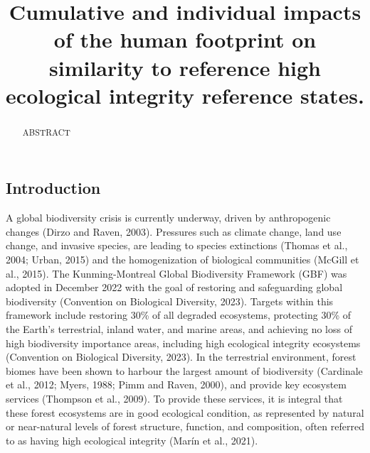 \documentclass[
]{agujournal2019}
\begin{document}
\title{Cumulative and individual impacts of the human footprint on
similarity to reference high ecological integrity reference states.}



\begin{abstract}
ABSTRACT
\end{abstract}




\subsection{Introduction}\label{introduction}

A global biodiversity crisis is currently underway, driven by
anthropogenic changes (Dirzo and Raven, 2003). Pressures such as climate
change, land use change, and invasive species, are leading to species
extinctions (Thomas et al., 2004; Urban, 2015) and the homogenization of
biological communities (McGill et al., 2015). The Kunming-Montreal
Global Biodiversity Framework (GBF) was adopted in December 2022 with
the goal of restoring and safeguarding global biodiversity (Convention
on Biological Diversity, 2023). Targets within this framework include
restoring 30\% of all degraded ecosystems, protecting 30\% of the
Earth's terrestrial, inland water, and marine areas, and achieving no
loss of high biodiversity importance areas, including high ecological
integrity ecosystems (Convention on Biological Diversity, 2023). In the
terrestrial environment, forest biomes have been shown to harbour the
largest amount of biodiversity (Cardinale et al., 2012; Myers, 1988;
Pimm and Raven, 2000), and provide key ecosystem services (Thompson et
al., 2009). To provide these services, it is integral that these forest
ecosystems are in good ecological condition, as represented by natural
or near-natural levels of forest structure, function, and composition,
often referred to as having high ecological integrity (Marín et al.,
2021).
\end{document}
